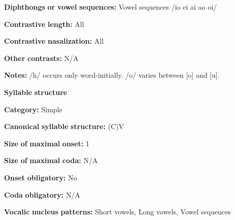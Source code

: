 \documentclass[output=paper]{langsci/langscibook}
\begin{document}
\begin{styleBody}
\textbf{Diphthongs} \textbf{or} \textbf{vowel} \textbf{sequences:} Vowel sequences /io ei ai ao oi/
\end{styleBody}

\begin{styleBody}
\textbf{Contrastive} \textbf{length:} All
\end{styleBody}

\begin{styleBody}
\textbf{Contrastive} \textbf{nasalization:} All
\end{styleBody}

\begin{styleBody}
\textbf{Other} \textbf{contrasts:} N/A
\end{styleBody}

\begin{styleBody}
\textbf{Notes:} /h/ occurs only word-initially. /o/ varies between [o] and [u]. 
\end{styleBody}

\begin{styleBody}
\textbf{Syllable} \textbf{structure}
\end{styleBody}

\begin{styleBody}
\textbf{Category:} Simple
\end{styleBody}

\begin{styleBody}
\textbf{Canonical} \textbf{syllable} \textbf{structure:} (C)V \citep[87-90]{Facundes2000}
\end{styleBody}

\begin{styleBody}
\textbf{Size} \textbf{of} \textbf{maximal} \textbf{onset:} 1
\end{styleBody}

\begin{styleBody}
\textbf{Size} \textbf{of} \textbf{maximal} \textbf{coda:} N/A
\end{styleBody}

\begin{styleBody}
\textbf{Onset} \textbf{obligatory:} No
\end{styleBody}

\begin{styleBody}
\textbf{Coda} \textbf{obligatory:} N/A
\end{styleBody}

\begin{styleBody}
\textbf{Vocalic} \textbf{nucleus} \textbf{patterns:} Short vowels, Long vowels, Vowel sequences
\end{styleBody}
\end{document}

